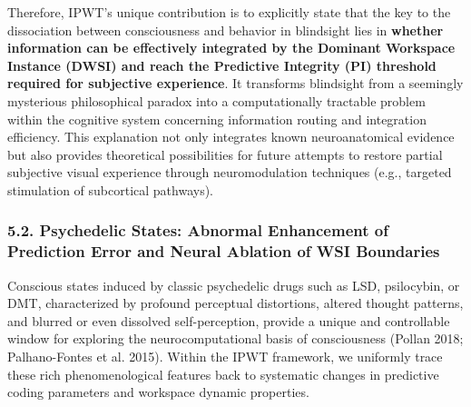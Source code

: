 \documentclass[
  a4paper]{article}
\begin{document}
Therefore, IPWT's unique contribution is to explicitly state that the
key to the dissociation between consciousness and behavior in blindsight
lies in \textbf{whether information can be effectively integrated by the
Dominant Workspace Instance (DWSI) and reach the Predictive Integrity
(PI) threshold required for subjective experience}. It transforms
blindsight from a seemingly mysterious philosophical paradox into a
computationally tractable problem within the cognitive system concerning
information routing and integration efficiency. This explanation not
only integrates known neuroanatomical evidence but also provides
theoretical possibilities for future attempts to restore partial
subjective visual experience through neuromodulation techniques (e.g.,
targeted stimulation of subcortical pathways).

\subsubsection{5.2. Psychedelic States: Abnormal Enhancement of
Prediction Error and Neural Ablation of WSI
Boundaries}\label{psychedelic-states-abnormal-enhancement-of-prediction-error-and-neural-ablation-of-wsi-boundaries}

Conscious states induced by classic psychedelic drugs such as LSD,
psilocybin, or DMT, characterized by profound perceptual distortions,
altered thought patterns, and blurred or even dissolved self-perception,
provide a unique and controllable window for exploring the
neurocomputational basis of consciousness (Pollan 2018; Palhano-Fontes
et al. 2015). Within the IPWT framework, we uniformly trace these rich
phenomenological features back to systematic changes in predictive
coding parameters and workspace dynamic properties.
\end{document}
